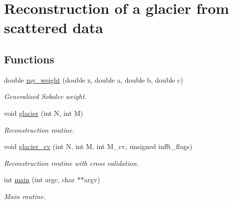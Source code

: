 \hypertarget{group__examples__solver__glacier}{
\section{Reconstruction of a glacier from scattered data}
\label{group__examples__solver__glacier}
}
\subsection*{Functions}
\begin{CompactItemize}
\item 
\hypertarget{group__examples__solver__glacier_ga0}{
double \hyperlink{group__examples__solver__glacier_ga0}{my\_\-weight} (double z, double a, double b, double c)}
\label{group__examples__solver__glacier_ga0}

\begin{CompactList}\small\item\em Generalised Sobolev weight. \item\end{CompactList}\item 
\hypertarget{group__examples__solver__glacier_ga1}{
void \hyperlink{group__examples__solver__glacier_ga1}{glacier} (int N, int M)}
\label{group__examples__solver__glacier_ga1}

\begin{CompactList}\small\item\em Reconstruction routine. \item\end{CompactList}\item 
\hypertarget{group__examples__solver__glacier_ga2}{
void \hyperlink{group__examples__solver__glacier_ga2}{glacier\_\-cv} (int N, int M, int M\_\-cv, unsigned infft\_\-flags)}
\label{group__examples__solver__glacier_ga2}

\begin{CompactList}\small\item\em Reconstruction routine with cross validation. \item\end{CompactList}\item 
\hypertarget{group__examples__solver__glacier_ga3}{
int \hyperlink{group__examples__solver__glacier_ga3}{main} (int argc, char $\ast$$\ast$argv)}
\label{group__examples__solver__glacier_ga3}

\begin{CompactList}\small\item\em Main routine. \item\end{CompactList}\end{CompactItemize}
